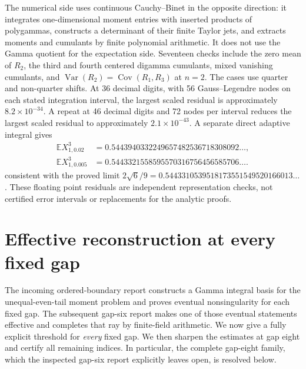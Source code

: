 \documentclass[11pt,a4paper]{article}
\numberwithin{equation}{section}
\theoremstyle{definition}
\theoremstyle{remark}
\begin{document}
The numerical side uses continuous Cauchy--Binet in the opposite
direction: it integrates one-dimensional moment entries with inserted
products of polygammas, constructs a determinant of their finite Taylor
jets, and extracts moments and cumulants by finite polynomial
arithmetic. It does not use the Gamma quotient for the expectation
side. Seventeen checks include the zero mean of $R_2$, the third and
fourth centered digamma cumulants, mixed vanishing cumulants, and
$\operatorname{Var}(R_2)=\operatorname{Cov}(R_1,R_3)$ at $n=2$.
The cases use quarter and non-quarter shifts. At 36 decimal digits,
with 56 Gauss--Legendre nodes on each stated integration interval, the
largest scaled residual is approximately $8.2\times10^{-34}$.
A repeat at 46 decimal digits and 72 nodes per interval
reduces the largest scaled residual to approximately $2.1\times10^{-43}$.
A separate direct adaptive integral gives
\[
 \begin{aligned}
 \mathbb EX_{1,0.02}^3
 &=0.5443940332249657482536718308092\ldots,\\
 \mathbb EX_{1,0.005}^3
 &=0.5443321558595570316756456585706\ldots.
 \end{aligned}
\]
consistent with the proved limit
$2\sqrt6/9=0.5443310539518173551549520166013\ldots$.
These floating point residuals are independent representation checks,
not certified error intervals or replacements for the analytic proofs.



\section{Effective reconstruction at every fixed gap}
\label{eg:section}

The incoming ordered-boundary report \cite{OrderedIncoming} constructs a Gamma integral basis
for the unequal-even-tail moment problem and proves eventual
nonsingularity for each fixed gap.  The subsequent gap-six report \cite{GapSix}
makes one of those eventual statements effective and completes that
ray by finite-field arithmetic.  We now give a fully explicit threshold
for \emph{every} fixed gap.  We then sharpen the estimates at gap eight
and certify all remaining indices.  In particular, the complete
gap-eight family, which the inspected gap-six report explicitly leaves
open, is resolved below.
\end{document}
